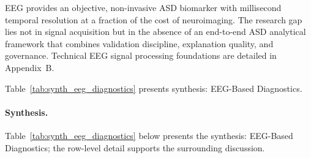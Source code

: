%
\fi


\noindent EEG provides an objective, non-invasive ASD biomarker with millisecond temporal resolution at a fraction of the cost of neuroimaging. The research gap lies not in signal acquisition but in the absence of an end-to-end ASD analytical framework that combines validation discipline, explanation quality, and governance. Technical EEG signal processing foundations are detailed in Appendix~B.



\noindent Table~\ref{tab:synth_eeg_diagnostics} presents synthesis: EEG-Based Diagnostics.

\paragraph{Synthesis.}


\noindent Table~\ref{tab:synth_eeg_diagnostics} below presents the synthesis: EEG-Based Diagnostics; the row-level detail supports the surrounding discussion.

